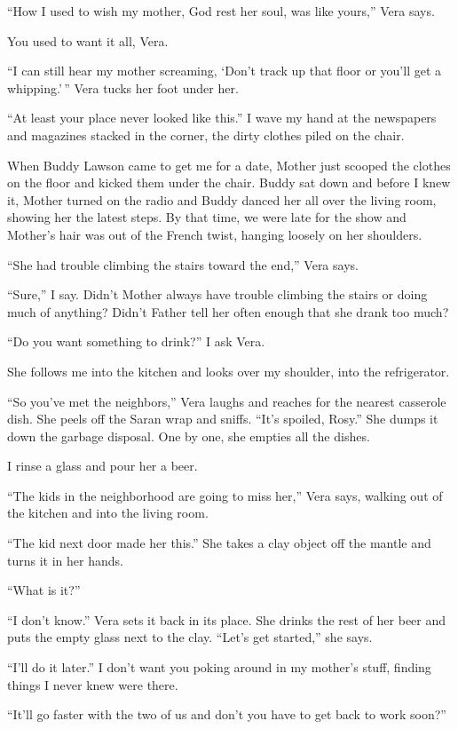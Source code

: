 \documentclass[
]{article}
\begin{document}
``How I used to wish my mother, God rest her soul, was like yours,''
Vera says.

You used to want it all, Vera.

``I can still hear my mother screaming, `Don't track up that floor or
you'll get a whipping.'\,'' Vera tucks her foot under her.

``At least your place never looked like this.'' I wave my hand at the
newspapers and magazines stacked in the corner, the dirty clothes piled
on the chair.

When Buddy Lawson came to get me for a date, Mother just scooped the
clothes on the floor and kicked them under the chair. Buddy sat down and
before I knew it, Mother turned on the radio and Buddy danced her all
over the living room, showing her the latest steps. By that time, we
were late for the show and Mother's hair was out of the French twist,
hanging loosely on her shoulders.

``She had trouble climbing the stairs toward the end,'' Vera says.

``Sure,'' I say. Didn't Mother always have trouble climbing the stairs
or doing much of any­thing? Didn't Father tell her often enough that she
drank too much?

``Do you want something to drink?'' I ask Vera.

She follows me into the kitchen and looks over my shoulder, into the
refrigerator.

``So you've met the neighbors,'' Vera laughs and reaches for the nearest
casserole dish. She peels off the Saran wrap and sniffs. ``It's spoiled,
Rosy.'' She dumps it down the garbage disposal. One by one, she empties
all the dishes.

I rinse a glass and pour her a beer.

``The kids in the neighborhood are going to miss her,'' Vera says,
walking out of the kitchen and into the living room.

``The kid next door made her this.'' She takes a clay object off the
mantle and turns it in her hands.

``What is it?''

``I don't know.'' Vera sets it back in its place. She drinks the rest of
her beer and puts the empty glass next to the clay. ``Let's get
started,'' she says.

``I'll do it later.'' I don't want you poking around in my mother's
stuff, finding things I never knew were there.

``It'll go faster with the two of us and don't you have to get back to
work soon?''
\end{document}
